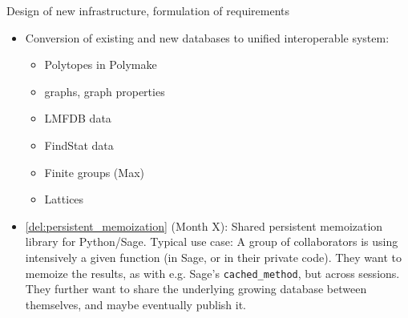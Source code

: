 \begin{Workpackage}{\thewpno}
\begin{task}{Design of new infrastructure, formulation of requirements}
\end{task}

\begin{WPDeliverables}
\begin{itemize}
\item Conversion of existing and new databases to unified interoperable system:
  \begin{itemize}
  \item Polytopes in Polymake
  \item graphs, graph properties
  \item LMFDB data
  \item FindStat data
  \item Finite groups (Max)
  \item Lattices
  \end{itemize}
  
\item \ref{del:persistent_memoization} (Month X): Shared persistent
  memoization library for Python/Sage.  Typical use case: A group of
  collaborators is using intensively a given function (in Sage, or in
  their private code). They want to memoize the results, as with
  e.g. Sage's \lstinline{cached_method}, but across sessions.  They
  further want to share the underlying growing database between
  themselves, and maybe eventually publish it.


\end{itemize}
\end{WPDeliverables}
\end{Workpackage}
